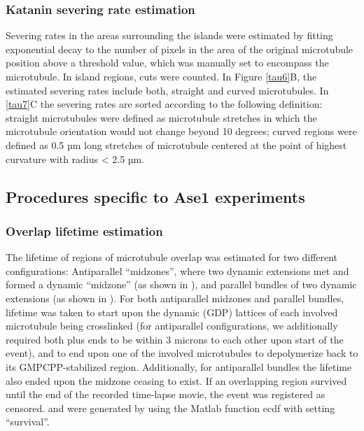 \subsubsection{Katanin severing rate estimation} 
Severing rates in the areas surrounding the islands were estimated by fitting exponential decay to the number of pixels in the area of the original microtubule position above a threshold value, which was manually set to encompass the microtubule. In island regions, cuts were counted. In Figure \ref{tau6}B, the estimated severing rates include both, straight and curved microtubules. In \ref{tau7}C the severing rates are sorted according to the following definition: straight microtubules were defined as microtubule stretches in which the microtubule orientation would not change beyond 10 degrees; curved regions were defined as 0.5 µm long stretches of microtubule centered at the point of highest curvature with radius < 2.5 µm.

\subsection{Procedures specific to Ase1 experiments}
\subsubsection{Overlap lifetime estimation}
The lifetime of regions of microtubule overlap was estimated for two different configurations: Antiparallel “midzones”, where two dynamic extensions met and formed a dynamic “midzone” (as shown in ), and parallel bundles of two dynamic extensions (as shown in ). For both antiparallel midzones and parallel bundles, lifetime was taken to start upon the dynamic (GDP) lattices of each involved microtubule being crosslinked (for antiparallel configurations, we additionally required both plus ends to be within 3 microns to each other upon start of the event), and to end upon one of the involved microtubules to depolymerize back to its GMPCPP-stabilized region. Additionally, for antiparallel bundles the lifetime also ended upon the midzone ceasing to exist. If an overlapping region survived until the end of the recorded time-lapse movie, the event was registered as censored.  and  were generated by using the Matlab function ecdf with setting “survival”.

